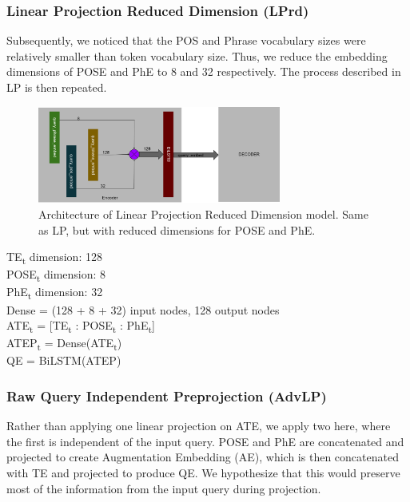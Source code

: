 \documentclass{IEEEtran}
\begin{document}
        \subsubsection{Linear Projection Reduced Dimension (LPrd)} 
        Subsequently, we noticed that the POS and Phrase vocabulary sizes were relatively smaller
        than token vocabulary size. Thus, we reduce the embedding dimensions
        of POSE and PhE to 8 and 32 respectively. The process described in LP is then repeated. \\

        \begin{figure}[h]
          \centering
          \includegraphics[width=8cm]{lprd.png}
          \caption{Architecture of Linear Projection Reduced Dimension model. Same as LP, but with
          reduced dimensions for POSE and PhE.}
          \label{fig:lprd}
        \end{figure}

        \hspace*{-3.5mm}TE\textsubscript{t} dimension: 128 \\
        POSE\textsubscript{t} dimension: 8 \\
        PhE\textsubscript{t} dimension: 32 \\
        Dense = (128 + 8 + 32) input nodes, 128 output nodes \\ 

        \hspace*{-3.5mm}ATE\textsubscript{t} = [TE\textsubscript{t} : 
        POSE\textsubscript{t} : PhE\textsubscript{t}] \\
        ATEP\textsubscript{t} = Dense(ATE\textsubscript{t}) \\
        QE = BiLSTM(ATEP) \\

        \subsubsection{Raw Query Independent Preprojection (AdvLP)}
        Rather than applying one linear projection on ATE, we apply two here, where the first is 
        independent of the input query. POSE and PhE are concatenated and projected to create
        Augmentation Embedding (AE), which is then concatenated with TE and projected to produce
        QE. We hypothesize that this would preserve most of the information from the input query
        during projection. \\
\end{document}

